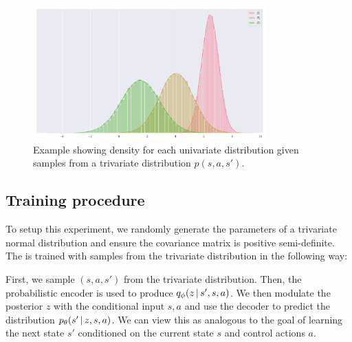 \begin{figure}
\begin{center}
\includegraphics[width=0.8\textwidth]{img/trivariate}
\caption{Example showing density for each univariate distribution given samples from a trivariate distribution $p(s, a, s')$.}
\end{center}
\end{figure}

\subsection{Training procedure}

To setup this experiment, we randomly generate the parameters of a trivariate normal distribution and ensure the covariance matrix is positive semi-definite. The \cvae{} is trained with samples from the trivariate distribution in the following way:

First, we sample $(s, a, s')$ from the trivariate distribution. Then, the probabilistic encoder is used to produce $\qphi \given{z}{s', s, a}$. We then modulate the posterior $z$ with the conditional input $s, a$ and use the decoder to predict the distribution $\ptheta \given{s'}{z, s, a}$. We can view this as analogous to the goal of learning the next state $s'$ conditioned on the current state $s$ and control actions $a$.


